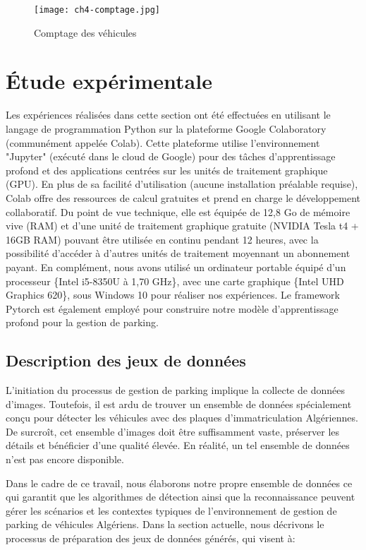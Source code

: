 \begin{figure}[H]
	\centering
	\texttt{[image: ch4-comptage.jpg]}
	\caption{ Comptage des véhicules}
    \label{ch4-comptage}
\end{figure}

\section{Étude expérimentale}

Les expériences réalisées dans cette section ont été effectuées en utilisant le langage de programmation Python sur la plateforme Google Colaboratory (communément appelée Colab). Cette plateforme utilise l'environnement "Jupyter" (exécuté dans le cloud de Google) pour des tâches d'apprentissage profond et des applications centrées sur les unités de traitement graphique (GPU). En plus de sa facilité d'utilisation (aucune installation préalable requise), Colab offre des ressources de calcul gratuites et prend en charge le développement collaboratif. Du point de vue technique, elle est équipée de 12,8 Go de mémoire vive (RAM) et d'une unité de traitement graphique gratuite (NVIDIA Tesla t4 + 16GB RAM) pouvant être utilisée en continu pendant 12 heures, avec la possibilité d'accéder à d'autres unités de traitement moyennant un abonnement payant. En complément, nous avons utilisé un ordinateur portable équipé d'un processeur \{Intel i5-8350U à 1,70 GHz\}, avec une carte graphique \{Intel UHD Graphics 620\}, sous Windows 10  pour réaliser nos expériences.
Le framework Pytorch est également employé pour construire notre modèle d'apprentissage profond pour la gestion de parking. 

\subsection{Description des jeux de données}

L'initiation du processus de gestion de parking implique la collecte de données d'images. Toutefois, il est ardu de trouver un ensemble de données spécialement conçu pour détecter les véhicules avec des plaques d'immatriculation Algériennes. De surcroît, cet ensemble d'images doit être suffisamment vaste, préserver les détails et bénéficier d'une qualité élevée. En réalité, un tel ensemble de données n'est pas encore disponible.

Dans le cadre de ce travail, nous élaborons notre propre ensemble de données ce qui garantit que les algorithmes de détection ainsi que la reconnaissance peuvent gérer les scénarios et les contextes typiques de l'environnement de gestion de parking de véhicules Algériens.
Dans la section actuelle, nous décrivons le processus de préparation des jeux de données générés, qui visent à: 

